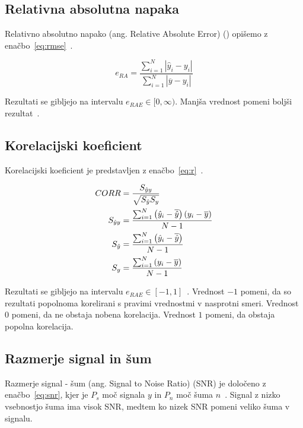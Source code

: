 \subsection{Relativna absolutna napaka}
Relativno absolutno napako (ang. Relative Absolute Error) (\rae) opišemo z enačbo~\eqref{eq:rmse}~\cite{trucco1998introductory}.

\begin{equation}
e_{RA} = \frac{\sum_{i=1}^{N} \left | \hat{y}_i - y_i \right |}{\sum_{i=1}^{N} \left| \overline{y} - y_i \right|}
\label{eq:rae}
\end{equation}

Rezultati se gibljejo na intervalu $e_{RAE} \in [0, \infty)$. Manjša vrednost pomeni boljši rezultat~\cite{witten2005data}.

\subsection{Korelacijski koeficient}
Korelacijski koeficient \corr je predstavljen z enačbo~\eqref{eq:r}~\cite{witten2005data}.

\begin{subequations}
\begin{align}
{CORR} &= \frac{S_{\hat{y}y}}{\sqrt{S_{\hat{y}} S_y}} \\
S_{\hat{y}y} &= \frac{\sum_{i=1}^N \left(\hat{y}_i - \overline{\hat{y}}\right)\left(y_i - \overline{y}\right) }{N-1} \\
S_{\hat{y}} &= \frac{\sum_{i=1}^N \left(\hat{y}_i - \overline{\hat{y}}\right)}{N-1} \\
S_y &= \frac{\sum_{i=1}^N \left(y_i - \overline{y}\right) }{N-1}
\end{align}
\label{eq:r}
\end{subequations}

Rezultati se gibljejo na intervalu $e_{RAE} \in [-1, 1]$~\cite{witten2005data}. Vrednost $-1$ pomeni, da so rezultati popolnoma korelirani s pravimi vrednostmi v nasprotni smeri. Vrednost $0$ pomeni, da ne obstaja nobena korelacija. Vrednost $1$ pomeni, da obstaja popolna korelacija.  


\subsection{Razmerje signal in šum}
Razmerje signal - šum (ang. Signal to Noise Ratio) (SNR) je določeno z enačbo~\eqref{eq:snr}, kjer je $P_s$ moč signala $y$ in $P_n$ moč šuma $n$~\cite{gonzalez2006digital}. Signal z nizko vsebnostjo šuma ima visok SNR, medtem ko nizek SNR pomeni veliko šuma v signalu.

